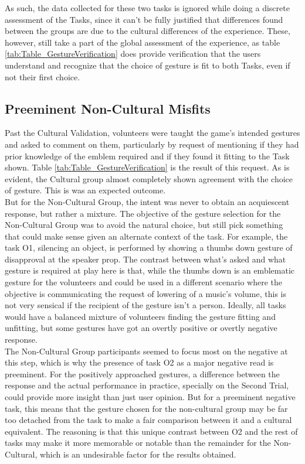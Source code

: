     As such, the data collected for these two tasks is ignored while doing a discrete assessment of the Tasks, since it can’t be fully justified that differences found between the groups are due to the cultural differences of the experience. These, however, still take a part of the global assessment of the experience, as table \ref{tab:Table_GestureVerification} does provide verification that the users understand and recognize that the choice of gesture is fit to both Tasks, even if not their first choice.\\



\subsection{Preeminent Non-Cultural Misfits} \label{sec:results_pretest_noncultural}
    Past the Cultural Validation, volunteers were taught the game’s intended gestures and asked to comment on them, particularly by request of mentioning if they had prior knowledge of the emblem required and if they found it fitting to the Task shown. Table \ref{tab:Table_GestureVerification} is the result of this request. As is evident, the Cultural group almost completely shown agreement with the choice of gesture. This is was an expected outcome.\\
    But for the Non-Cultural Group, the intent was never to obtain an acquiescent response, but rather a mixture. The objective of the gesture selection for the Non-Cultural Group was to avoid the natural choice, but still pick something that could make sense given an alternate context of the task. For example, the task O1, silencing an object, is performed by showing a thumbs down gesture of disapproval at the speaker prop. The contrast between what’s asked and what gesture is required at play here is that, while the thumbs down is an emblematic gesture for the volunteers and could be used in a different scenario where the objective is communicating the request of lowering of a music’s volume, this is not very sensical if the recipient of the gesture isn’t a person. Ideally, all tasks would have a balanced mixture of volunteers finding the gesture fitting and unfitting, but some gestures have got an overtly positive or overtly negative response.\\
    The Non-Cultural Group participants seemed to focus most on the negative at this step, which is why the presence of task O2 as a major negative read is preeminent. For the positively approached gestures, a difference between the response and the actual performance in practice, specially on the Second Trial, could provide more insight than just user opinion. But for a preeminent negative task, this means that the gesture chosen for the non-cultural group may be far too detached from the task to make a fair comparison between it and a cultural equivalent. The reasoning is that this unique contrast between O2 and the rest of tasks may make it more memorable or notable than the remainder for the Non-Cultural, which is an undesirable factor for the results obtained.\\
